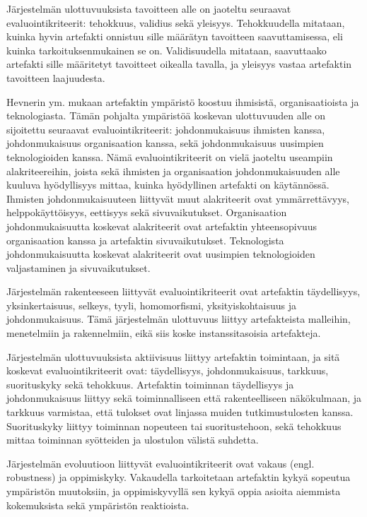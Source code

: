 \documentclass[utf8]{gradu3}
\begin{document}
Järjestelmän ulottuvuuksista tavoitteen alle on jaoteltu seuraavat evaluointikriteerit:  tehokkuus, validius sekä yleisyys. Tehokkuudella mitataan, kuinka hyvin artefakti onnistuu sille määrätyn tavoitteen saavuttamisessa, eli kuinka tarkoituksenmukainen se on. Validisuudella mitataan, saavuttaako artefakti sille määritetyt tavoitteet oikealla tavalla,  ja yleisyys vastaa artefaktin tavoitteen laajuudesta. \parencite{evaluation}

Hevnerin ym. \parencite*{hevner2004} mukaan artefaktin ympäristö koostuu ihmisistä, organisaatioista ja teknologiasta. Tämän pohjalta ympäristöä koskevan ulottuvuuden alle on sijoitettu seuraavat evaluointikriteerit: johdonmukaisuus ihmisten kanssa, johdonmukaisuus organisaation kanssa, sekä johdonmukaisuus uusimpien teknologioiden kanssa. Nämä evaluointikriteerit on vielä jaoteltu useampiin alakriteereihin, joista sekä ihmisten ja organisaation johdonmukaisuuden alle kuuluva hyödyllisyys mittaa, kuinka hyödyllinen artefakti on käytännössä. Ihmisten johdonmukaisuuteen liittyvät muut alakriteerit ovat ymmärrettävyys, helppokäyttöisyys, eettisyys sekä sivuvaikutukset. Organisaation johdonmukaisuutta koskevat alakriteerit ovat artefaktin yhteensopivuus organisaation kanssa ja artefaktin sivuvaikutukset. Teknologista johdonmukaisuutta koskevat alakriteerit ovat uusimpien teknologioiden valjastaminen ja sivuvaikutukset. \parencite{evaluation}

Järjestelmän rakenteeseen liittyvät evaluointikriteerit ovat artefaktin täydellisyys, yksinkertaisuus, selkeys, tyyli, homomorfismi, yksityiskohtaisuus ja johdonmukaisuus. Tämä järjestelmän ulottuvuus liittyy artefakteista malleihin, menetelmiin ja rakennelmiin, eikä siis koske instanssitasoisia artefakteja. \parencite{evaluation}

Järjestelmän ulottuvuuksista aktiivisuus liittyy artefaktin toimintaan, ja sitä koskevat evaluointikriteerit ovat: täydellisyys,  johdonmukaisuus, tarkkuus, suorituskyky sekä tehokkuus. Artefaktin toiminnan täydellisyys ja johdonmukaisuus liittyy sekä toiminnalliseen että rakenteelliseen näkökulmaan, ja tarkkuus varmistaa, että tulokset ovat linjassa muiden tutkimustulosten kanssa. Suorituskyky liittyy toiminnan nopeuteen tai suoritustehoon, sekä tehokkuus mittaa toiminnan syötteiden ja ulostulon välistä suhdetta. \parencite{evaluation}

Järjestelmän evoluutioon liittyvät evaluointikriteerit ovat vakaus (engl. robustness) ja oppimiskyky. Vakaudella tarkoitetaan artefaktin kykyä sopeutua ympäristön muutoksiin, ja oppimiskyvyllä sen kykyä oppia asioita aiemmista kokemuksista sekä ympäristön reaktioista. \parencite{evaluation}
\end{document}
